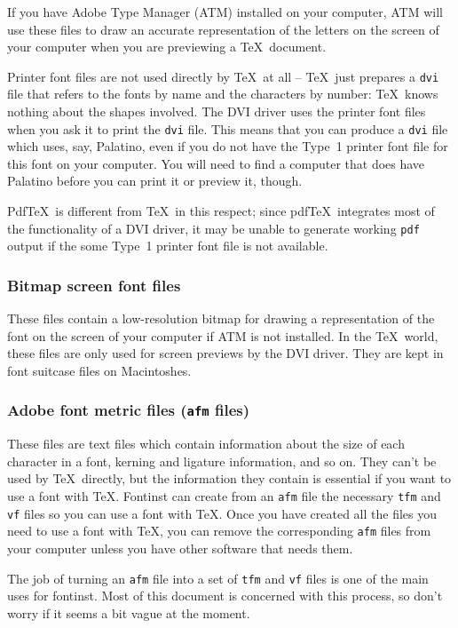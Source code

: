 \documentclass[a4paper]{ltxguide}
\newcommand*{\setfilename}[1]{\texttt{#1}}
\newcommand*{\setpackagename}[1]{\textsf{#1}}
\newcommand{\fontinst}{\setpackagename{font\-inst}\xspace}
\newcommand{\Fontinst}{\setpackagename{Font\-inst}\xspace}
\newcommand{\vf} {\setfilename{vf}\xspace}
\newcommand{\afm}{\setfilename{afm}\xspace}
\newcommand{\tfm}{\setfilename{tfm}\xspace}
\newcommand{\dvi}{\setfilename{dvi}\xspace}
\newcommand{\pdf}{\setfilename{pdf}\xspace}
\begin{document}
If you have Adobe Type Manager (ATM) installed on your computer,
ATM will use these files to draw an accurate representation of the
letters on the screen of your computer when you are previewing a
\TeX\ document.

Printer font files are not used directly by \TeX\ at all -- \TeX\
just prepares a \dvi file that refers to the fonts by name and the
characters by number: \TeX\ knows nothing about the shapes
involved.  The DVI driver uses the printer font files when you ask
it to print the \dvi file.  This means that you can produce a \dvi
file which uses, say, Palatino, even if you do not have the
Type~1 printer font file for this font on your computer.  You will
need to find a computer that does have Palatino before you can
print it or preview it, though.

Pdf\TeX\ is different from \TeX\ in this respect; since pdf\TeX\ 
integrates most of the functionality of a DVI driver, it may be unable 
to generate working \pdf output if the some Type~1 printer font file 
is not available.


\subsubsection{Bitmap screen font files}

These files contain a low-resolution bitmap for drawing a
representation of the font on the screen of your computer if ATM
is not installed.  In the \TeX\ world, these files are only used
for screen previews by the DVI driver.  They are kept in font
suitcase files on Macintoshes.


\subsubsection{Adobe font metric files (\afm files)}

These files are text files which contain information about the
size of each character in a font, kerning and ligature
information, and so on.  They can't be used by \TeX\ directly, but
the information they contain is essential if you want to use a
font with \TeX. \Fontinst can create from an \afm file the
necessary \tfm and \vf files so you can use a font with \TeX.
Once you have created all the files you need to use a font with
\TeX, you can remove the corresponding \afm files from your
computer unless you have other software that needs them.

The job of turning an \afm file into a set of \tfm and \vf files
is one of the main uses for \fontinst.  Most of this document is
concerned with this process, so don't worry if it seems a bit
vague at the moment.
\end{document}
